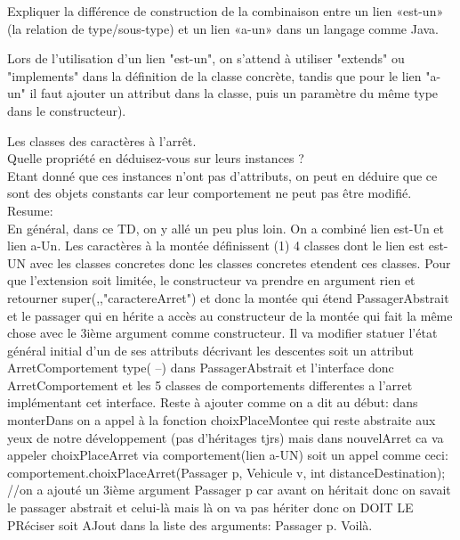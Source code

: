 \documentclass{article}
\begin{document}
Expliquer la différence de construction de la combinaison entre un lien «est-un» (la relation de type/sous-type) et un lien «a-un» dans un langage comme Java.

Lors de l’utilisation d’un lien "est-un", on s’attend à utiliser "extends" ou "implements" dans la définition de la classe concrète, tandis que pour le lien "a-un" il faut ajouter un attribut dans la classe, puis un paramètre du même type dans le constructeur).\newline


Les classes des caractères à l’arrêt.\\



Quelle propriété en déduisez-vous sur leurs instances ?\\

Etant donné que ces instances n’ont pas d’attributs, on peut en déduire que ce sont des objets constants car leur comportement ne peut pas être modifié.
\newline
Resume:
\\
En général, dans ce TD, on y allé un peu plus loin. On a combiné lien est-Un et lien a-Un. Les caractères à la montée définissent (1) 4 classes dont le lien est est-UN avec les classes concretes donc les classes concretes etendent ces classes. Pour que l'extension soit limitée, le constructeur va prendre en argument rien et retourner super(,,"caractereArret") et donc la montée qui étend PassagerAbstrait et le passager qui en hérite a accès au constructeur de la montée qui fait la même chose avec le 3ième argument comme constructeur. Il va modifier statuer l'état général initial d'un de ses attributs décrivant les descentes soit un attribut ArretComportement type( --) dans PassagerAbstrait et l'interface donc ArretComportement et les 5 classes de comportements differentes a l'arret implémentant cet interface. Reste à ajouter comme on a dit au début: dans monterDans on a appel à la fonction choixPlaceMontee qui reste abstraite aux yeux de notre développement (pas d'héritages tjrs) mais dans nouvelArret ca va appeler choixPlaceArret via comportement(lien a-UN) soit un appel comme ceci:
comportement.choixPlaceArret(Passager p, Vehicule v, int distanceDestination); //on a ajouté un 3ième argument Passager p car avant on héritait donc on savait le passager abstrait et celui-là mais là on va pas hériter donc on DOIT LE PRéciser soit AJout dans la liste des arguments: Passager p. Voilà.

\newline
\end{document}
